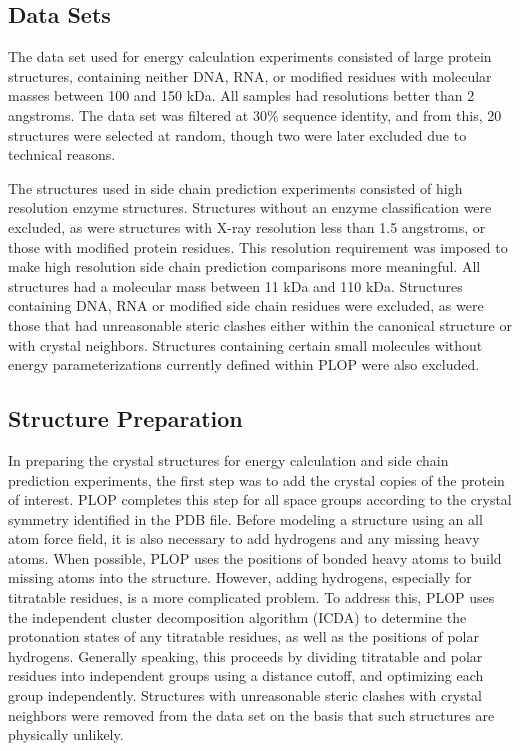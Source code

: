 \subsection*{Data Sets}
\label{subsec:data_sets}
The data set used for energy calculation experiments consisted of large protein structures, containing neither DNA, RNA, or modified residues with molecular masses between 100 and 150 kDa. 
All samples had resolutions better than 2 angstroms. 
The data set was filtered at 30\% sequence identity, and from this, 20 structures were selected at random, though two were later excluded due to technical reasons.

The structures used in side chain prediction experiments consisted of high resolution enzyme structures.
Structures without an enzyme classification were excluded, as were structures with X-ray resolution less than 1.5 angstroms, or those with modified protein residues.
This resolution requirement was imposed to make high resolution side chain prediction comparisons more meaningful.
All structures had a molecular mass between 11 kDa and 110 kDa.
Structures containing DNA, RNA or modified side chain residues were excluded, as were those that had unreasonable steric clashes either within the canonical structure or with crystal neighbors.
Structures containing certain small molecules without energy parameterizations currently defined within PLOP were also excluded.

\subsection*{Structure Preparation}
\label{subsec:structure_preparation}
In preparing the crystal structures for energy calculation and side chain prediction experiments, the first step was to add the crystal copies of the protein of interest.
PLOP completes this step for all space groups according to the crystal symmetry identified in the PDB file.
Before modeling a structure using an all atom force field, it is also necessary to add hydrogens and any missing heavy atoms.
When possible, PLOP uses the positions of bonded heavy atoms to build missing atoms into the structure.
However, adding hydrogens, especially for titratable residues, is a more complicated problem.
To address this, PLOP uses the independent cluster decomposition algorithm (ICDA) to determine the protonation states of any titratable residues, as well as the positions of polar hydrogens\cite{li2007assignment}.
Generally speaking, this proceeds by dividing titratable and polar residues into independent groups using a distance cutoff, and optimizing each group independently.
Structures with unreasonable steric clashes with crystal neighbors were removed from the data set on the basis that such structures are physically unlikely.


